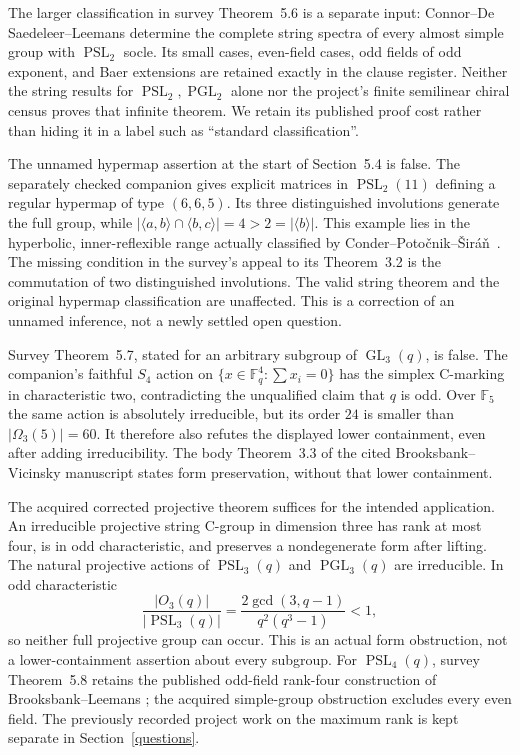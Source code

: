 \documentclass[11pt]{article}
\newcommand{\gen}[1]{\langle#1\rangle}
\newcommand{\PSL}{\operatorname{PSL}}\newcommand{\PGL}{\operatorname{PGL}}
\newcommand{\note}[1]{\marginpar{\raggedright\scriptsize #1}}
\begin{document}
The larger classification in survey Theorem~5.6 is a separate input:
Connor--De Saedeleer--Leemans \cite{almost2} determine the complete
string spectra of every almost simple group with $\PSL_2$ socle.
Its small cases, even-field cases, odd fields of odd exponent, and
Baer extensions are retained exactly in the clause register. Neither
the string results for $\PSL_2,\PGL_2$ alone nor the project's finite
semilinear chiral census proves that infinite theorem. We retain its
published proof cost rather than hiding it in a label such as
``standard classification''.

\note{Correction}
The unnamed hypermap assertion at the start of Section~5.4 is false.
The separately checked companion gives explicit matrices in
$\operatorname{PSL}_2(11)$ defining a regular hypermap of type $(6,6,5)$.
Its three distinguished involutions generate the full group, while
$|\gen{a,b}\cap\gen{b,c}|=4>2=|\gen b|$.
This example lies in the hyperbolic, inner-reflexible range actually
classified by Conder--Poto\v cnik--\v Sir\'a\v n~\cite{hypermaps}.
The missing condition in the survey's appeal to its Theorem~3.2 is the
commutation of two distinguished involutions. The valid string theorem
and the original hypermap classification are unaffected. This is a
correction of an unnamed inference, not a newly settled open question.

\note{Correction}
Survey Theorem~5.7, stated for an arbitrary subgroup of
$\operatorname{GL}_3(q)$, is false. The companion's faithful $S_4$
action on $\{x\in\mathbb F_q^4:\sum x_i=0\}$ has the simplex
C-marking in characteristic two, contradicting the unqualified claim
that $q$ is odd. Over $\mathbb F_5$ the same action is absolutely
irreducible, but its order $24$ is smaller than
$|\Omega_3(5)|=60$. It therefore also refutes the displayed lower
containment, even after adding irreducibility. The body Theorem~3.3
of the cited Brooksbank--Vicinsky manuscript states form preservation,
without that lower containment.

The acquired corrected projective theorem suffices for the intended
application. An irreducible projective string C-group in dimension
three has rank at most four, is in odd characteristic, and preserves
a nondegenerate form after lifting. The natural projective actions
of $\PSL_3(q)$ and $\PGL_3(q)$ are irreducible. In odd characteristic
\[
       \frac{|O_3(q)|}{|\PSL_3(q)|}
       =\frac{2\gcd(3,q-1)}{q^2(q^3-1)}<1,
\]
so neither full projective group can occur. This is an actual form
obstruction, not a lower-containment assertion about every subgroup.
For $\PSL_4(q)$, survey Theorem~5.8 retains the published odd-field
rank-four construction of Brooksbank--Leemans \cite{linear4}; the
acquired simple-group obstruction excludes every even field.
The previously recorded project work on the maximum rank is kept
separate in Section~\ref{questions}.
\end{document}
